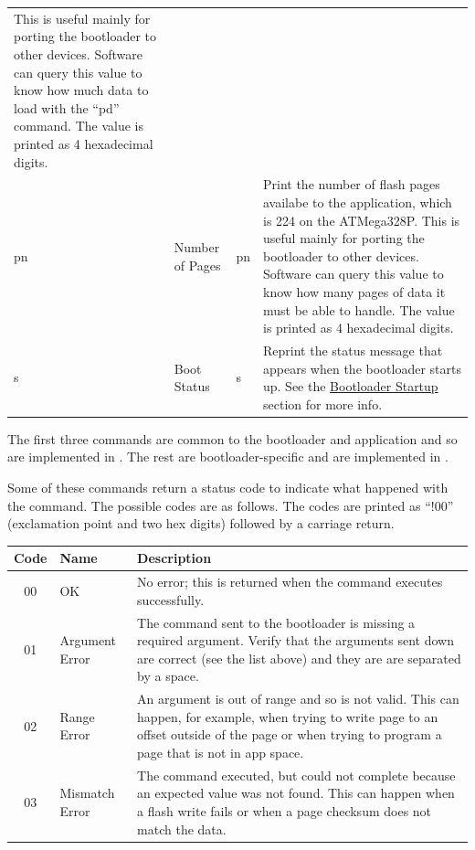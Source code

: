 \documentclass{article}
\begin{document}
\begin{longtable}{l|l|p{}|p{}}
    This is useful mainly for porting the bootloader to other devices.  Software can query this
    value to know how much data to load with the ``pd'' command.  The value is printed as 4
    hexadecimal digits.  \\
    pn & Number of Pages & pn & Print the number of flash pages availabe to the application,
    which is 224 on the ATMega328P.  This is useful mainly for porting the bootloader to other
    devices.  Software can query this value to know how many pages of data it must be able to
    handle.  The value is printed as 4 hexadecimal digits. \\
    s & Boot Status & s & Reprint the status message that appears when the bootloader starts
    up.  See the \hyperref[sssec:FWBootStartup]{Bootloader Startup} section for more info. \\
\end{longtable}

The first three commands are common to the bootloader and application and so are implemented in
.  The rest are bootloader-specific and are implemented in
.

Some of these commands return a status code to indicate what happened with the command.  The
possible codes are as follows.  The codes are printed as ``!00'' (exclamation point and two hex
digits) followed by a carriage return.

\label{tab:FWBootErrors}
\begin{center}
    \begin{tabular}{c|l|p{}}
        Code & Name & Description \\
        \hline
        00 & OK & No error; this is returned when the command executes successfully. \\
        01 & Argument Error & The command sent to the bootloader is missing a required argument.
        Verify that the arguments sent down are correct (see the list above) and they are are
        separated by a space. \\
        02 & Range Error & An argument is out of range and so is not valid.  This can happen, for
        example, when trying to write page to an offset outside of the page or when trying to
        program a page that is not in app space. \\
        03 & Mismatch Error & The command executed, but could not complete because an expected value
        was not found.  This can happen when a flash write fails or when a page checksum does not
        match the data. \\
    \end{tabular}
\end{center}
\end{document}
